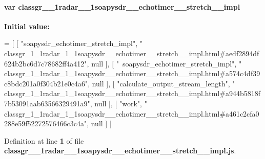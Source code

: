 \paragraph[{classgr\+\_\+1\+\_\+1radar\+\_\+1\+\_\+1soapysdr\+\_\+\+\_\+echotimer\+\_\+\+\_\+stretch\+\_\+\+\_\+impl}]{\setlength{\rightskip}{0pt plus 5cm}var classgr\+\_\+\_\+1radar\+\_\+\_\+1soapysdr\+\_\+\+\_\+echotimer\+\_\+\+\_\+stretch\+\_\+\+\_\+impl}\label{classgr__1__1radar__1__1soapysdr____echotimer____stretch____impl_8js_a85ce5f6c90b2c67e46f468960333037a}
{\bfseries Initial value\+:}
\begin{DoxyCode}
=
[
    [ \textcolor{stringliteral}{"soapysdr\_echotimer\_stretch\_impl"}, \textcolor{stringliteral}{"
      classgr\_1\_1radar\_1\_1soapysdr\_\_echotimer\_\_stretch\_\_impl.html#aedf2894df624b2bc6d7c78682ff4a412"}, null ],
    [ \textcolor{stringliteral}{"~soapysdr\_echotimer\_stretch\_impl"}, \textcolor{stringliteral}{"
      classgr\_1\_1radar\_1\_1soapysdr\_\_echotimer\_\_stretch\_\_impl.html#a574c4df39c8bdc201a0f304b21e0c4a6"}, null ],
    [ \textcolor{stringliteral}{"calculate\_output\_stream\_length"}, \textcolor{stringliteral}{"
      classgr\_1\_1radar\_1\_1soapysdr\_\_echotimer\_\_stretch\_\_impl.html#a944b5818f7b53091aab63566329491a9"}, null ],
    [ \textcolor{stringliteral}{"work"}, \textcolor{stringliteral}{"
      classgr\_1\_1radar\_1\_1soapysdr\_\_echotimer\_\_stretch\_\_impl.html#a461c2cfa0288e59f52272576466c3c4a"}, null ]
]
\end{DoxyCode}


Definition at line {\bf 1} of file {\bf classgr\+\_\+\_\+1radar\+\_\+\_\+1soapysdr\+\_\+\+\_\+echotimer\+\_\+\+\_\+stretch\+\_\+\+\_\+impl.\+js}.

